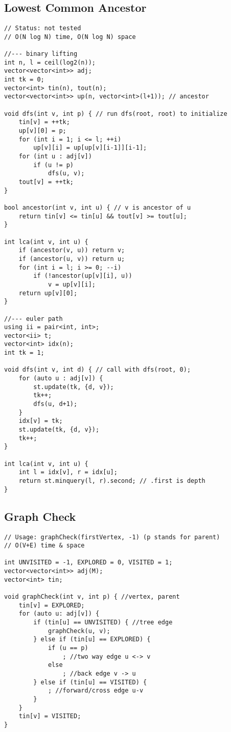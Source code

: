 \documentclass[12pt, a4paper, twoside]{article}
\begin{document}
\subsection{Lowest Common Ancestor}
\begin{lstlisting}
// Status: not tested
// O(N log N) time, O(N log N) space

//--- binary lifting
int n, l = ceil(log2(n));
vector<vector<int>> adj;
int tk = 0;
vector<int> tin(n), tout(n);
vector<vector<int>> up(n, vector<int>(l+1)); // ancestor

void dfs(int v, int p) { // run dfs(root, root) to initialize
	tin[v] = ++tk;
	up[v][0] = p;
	for (int i = 1; i <= l; ++i)
		up[v][i] = up[up[v][i-1]][i-1];
	for (int u : adj[v])
		if (u != p)
			dfs(u, v);
	tout[v] = ++tk;
}

bool ancestor(int v, int u) { // v is ancestor of u
	return tin[v] <= tin[u] && tout[v] >= tout[u];
}

int lca(int v, int u) {
	if (ancestor(v, u)) return v;
	if (ancestor(u, v)) return u;
	for (int i = l; i >= 0; --i)
		if (!ancestor(up[v][i], u))
			v = up[v][i];
	return up[v][0];
}

//--- euler path
using ii = pair<int, int>;
vector<ii> t;
vector<int> idx(n);
int tk = 1;

void dfs(int v, int d) { // call with dfs(root, 0);
	for (auto u : adj[v]) {
		st.update(tk, {d, v});
		tk++;
		dfs(u, d+1);
	}
	idx[v] = tk;
	st.update(tk, {d, v});
	tk++;
}

int lca(int v, int u) {
	int l = idx[v], r = idx[u];
	return st.minquery(l, r).second; // .first is depth
}
\end{lstlisting}

\subsection{Graph Check}
\begin{lstlisting}
// Usage: graphCheck(firstVertex, -1) (p stands for parent)
// O(V+E) time & space

int UNVISITED = -1, EXPLORED = 0, VISITED = 1;
vector<vector<int>> adj(M);
vector<int> tin;

void graphCheck(int v, int p) { //vertex, parent
	tin[v] = EXPLORED;
	for (auto u: adj[v]) {
		if (tin[u] == UNVISITED) { //tree edge
			graphCheck(u, v);
		} else if (tin[u] == EXPLORED) {
			if (u == p)
				; //two way edge u <-> v
			else
				; //back edge v -> u
		} else if (tin[u] == VISITED) {
			; //forward/cross edge u-v
		}
	}
	tin[v] = VISITED;
}
\end{lstlisting}
\end{document}
